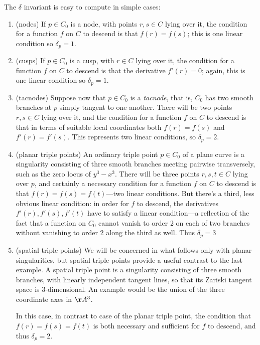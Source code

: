 The $\delta$ invariant is easy to compute in simple cases:
\begin{enumerate}

\item (nodes) If $p \in C_0$ is a node, with points $r,s \in C$ lying over it, the condition for a function $f$ on $C$ to descend is  that $f(r)=f(s)$; this is one linear condition so $\delta_p = 1$.

\item (cusps) If $p \in C_0$ is a cusp, with  $r \in C$ lying over it, the condition for a function $f$ on $C$ to descend is that the derivative $f'(r)=0$; again, this is one linear condition so $\delta_p = 1$.

\item (tacnodes) Suppose now that $p \in C_0$ is a \emph{tacnode}, that is, $C_0$ has two smooth branches at $p$ simply tangent to one another. There will be two points $r, s \in C$ lying over it, and the condition for a function $f$ on $C$ to descend is that in terms of suitable local coordinates both $f(r)=f(s)$ and $f'(r)=f'(s)$.  This represents two linear conditions, so $\delta_p = 2$.

\item (planar triple points) An ordinary triple point $p \in C_0$ of a plane curve is a singularity consisting of three smooth branches meeting pairwise transversely, such as the zero locus of $y^3-x^3$. There will be three points $r,s,t \in C$ lying over $p$, and certainly a necessary condition for a function $f$ on $C$ to descend is that $f(r)=f(s)=f(t)$---two linear conditions. But there's a third, less obvious linear condition: in order for $f$ to descend, the derivatives $f'(r), f'(s), f'(t)$ have to satisfy a linear condition---a reflection of the fact that a function on $C_0$ cannot vanish to order 2 on each of two branches without vanishing to order 2 along the third as well. Thus $\delta_p = 3$

\item (spatial triple points) We will be concerned in what follows only with planar singularities, but spatial triple points provide a useful contrast to the last example. A spatial triple point is a singularity consisting of three smooth branches, with linearly independent tangent lines, so that its Zariski tangent space is 3-dimensional. An example would be the union of the three coordinate axes in $\AA^3$.

In this case, in contrast to case of the planar triple point, the condition that $f(r)=f(s)=f(t)$ is both necessary and sufficient for $f$ to descend, and thus  $\delta_p=2$.

\end{enumerate}

